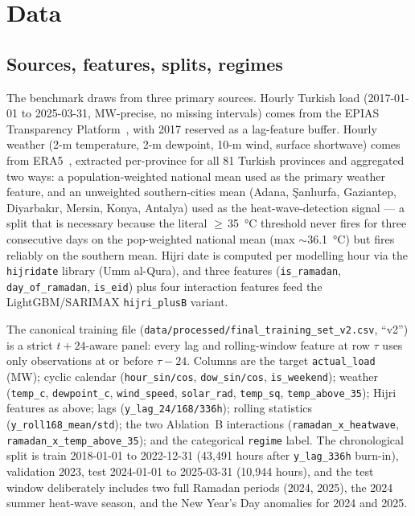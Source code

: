 \documentclass[10pt, a4paper, twocolumn]{article}
\begin{document}
\section{Data}
\label{sec:data}

\subsection{Sources, features, splits, regimes}

The benchmark draws from three primary sources. Hourly Turkish
load (2017-01-01 to 2025-03-31, MW-precise, no missing intervals)
comes from the EPIAS Transparency Platform~\cite{epias}, with
2017 reserved as a lag-feature buffer. Hourly weather (2-m
temperature, 2-m dewpoint, 10-m wind, surface shortwave) comes
from ERA5~\cite{hersbach2020era5}, extracted per-province for all
81 Turkish provinces and aggregated two ways: a population-weighted
national mean used as the primary weather feature, and an
unweighted southern-cities mean (Adana, Şanlıurfa, Gaziantep,
Diyarbakır, Mersin, Konya, Antalya) used as the heat-wave-detection
signal --- a split that is necessary because the literal
$\geq\,$\SI{35}{\celsius} threshold never fires for three
consecutive days on the pop-weighted national mean (max
$\sim$\SI{36.1}{\celsius}) but fires reliably on the southern
mean. Hijri date is computed per modelling hour via the
\texttt{hijridate} library (Umm al-Qura), and three features
(\texttt{is\_ramadan}, \texttt{day\_of\_ramadan},
\texttt{is\_eid}) plus four interaction features feed the
LightGBM/SARIMAX \texttt{hijri\_plusB} variant.

The canonical training file
(\texttt{data/processed/final\_training\_set\_v2.csv}, ``v2'') is
a strict $t+24$-aware panel: every lag and rolling-window feature
at row $\tau$ uses only observations at or before $\tau-24$.
Columns are the target \texttt{actual\_load} (MW); cyclic
calendar (\texttt{hour\_sin/cos}, \texttt{dow\_sin/cos},
\texttt{is\_weekend}); weather
(\texttt{temp\_c}, \texttt{dewpoint\_c}, \texttt{wind\_speed},
\texttt{solar\_rad}, \texttt{temp\_sq}, \texttt{temp\_above\_35});
Hijri features as above; lags (\texttt{y\_lag\_24/168/336h});
rolling statistics (\texttt{y\_roll168\_mean/std}); the two
Ablation~B interactions (\texttt{ramadan\_x\_heatwave},
\texttt{ramadan\_x\_temp\_above\_35}); and the categorical
\texttt{regime} label. The chronological split is train
2018-01-01 to 2022-12-31 (43{,}491 hours after
\texttt{y\_lag\_336h} burn-in), validation 2023, test
2024-01-01 to 2025-03-31 (10{,}944 hours), and the test window
deliberately includes two full Ramadan periods (2024, 2025), the
2024 summer heat-wave season, and the New Year's Day anomalies
for 2024 and 2025.
\end{document}
